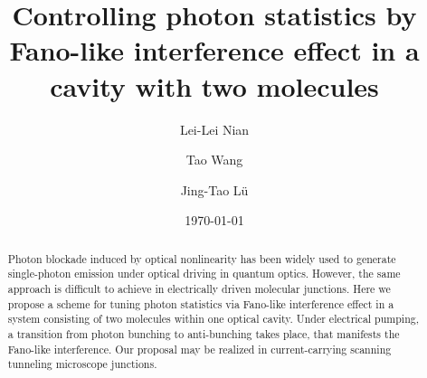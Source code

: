 \documentclass[aps,prb,
,floatfix,footinbib,longbibliography,
preprint
]{revtex4-2}
\newcommand{\revision}[1]{{\color{blue}{#1}}}
\newcommand{\JT}[1]{{\color{red}{#1}}}
\begin{document}
\title{Controlling photon statistics by Fano-like interference effect in a cavity with two molecules}

\author{Lei-Lei Nian}
\author{Tao Wang}
\author{Jing-Tao L\"{u}}




\date{\today}%
\begin{abstract}
Photon blockade induced by optical nonlinearity has been widely used to generate single-photon emission under optical driving in quantum optics. However, the same approach is difficult to achieve in electrically driven molecular junctions. Here we propose a scheme for tuning photon statistics via Fano-like interference effect in a system consisting of two molecules within one optical cavity.
Under electrical pumping, a transition from photon bunching to anti-bunching takes place, that manifests the Fano-like interference. \revision{Even in presence of the strong dipole-dipole interaction between molecules, a strong photon anti-bunching can be achieved based on the parameters extracted from experiments.}
Our proposal may be realized in current-carrying scanning tunneling microscope junctions.


\end{abstract}

\maketitle

\end{document}
